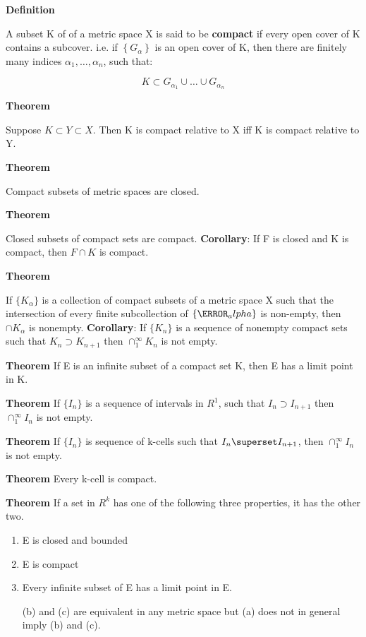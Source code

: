 \documentclass[11pt]{article}
\begin{document}
\textbf{Definition}

A subset K of of a metric space X is said to be \textbf{compact} if every open cover of K contains a subcover. i.e. if \(\left\{G_\alpha \right\}\) is an open cover of K, then there are finitely many indices \(\alpha_1, \ldots, \alpha_n\), such that:

\[
K \subset G_{\alpha_1} \cup \ldots \cup G_{\alpha_n}
\]

\textbf{Theorem}

Suppose \(K \subset Y \subset X\). Then K is compact relative to X iff K is compact relative to Y.


\textbf{Theorem}

Compact subsets of metric spaces are closed.

\textbf{Theorem}

Closed subsets of compact sets are compact.
\textbf{Corollary}: If F is closed and K is compact, then \(F \cap K\) is compact.

\textbf{Theorem}

If \(\{K_\alpha\}\) is a collection of compact subsets of a metric space X such that the intersection of every finite subcollection of \(\{\K_alpha\}\) is non-empty, then \(\cap K_\alpha\) is nonempty.
\textbf{Corollary}: If \(\{K_n\}\) is a sequence of nonempty compact sets such that \(K_n \supset K_{n+1}\) then \(\cap_1^\infty K_n\) is not empty.

\textbf{Theorem}
If E is an infinite subset of a compact set K, then E has a limit point in K.

\textbf{Theorem}
If \(\{I_n\}\) is a sequence of intervals in \(R^1\), such that \(I_n \supset I_{n+1}\) then \(\cap^\infty_1 I_n\) is not empty.

\textbf{Theorem}
If \(\{I_n\}\) is sequence of k-cells such that \(I_n \superset I_{n+1}\), then \(\cap^\infty_1 I_n\) is not empty.

\textbf{Theorem}
Every k-cell is compact.

\textbf{Theorem}
If a set in \(R^k\) has one of the following three properties, it has the other two.

\begin{enumerate}
\item E is closed and bounded
\item E is compact
\item Every infinite subset of E has a limit point in E.

(b) and (c) are equivalent in any metric space but (a) does not in general imply (b) and (c).
\end{enumerate}
\end{document}
